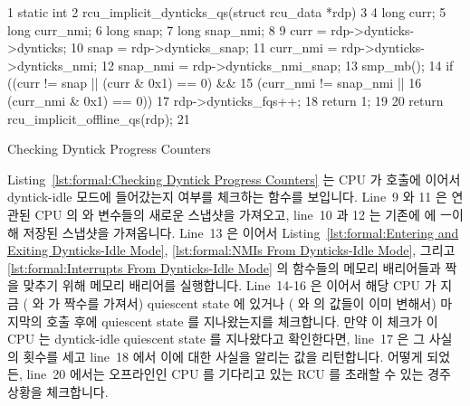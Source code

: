 \begin{listing}[tbp]
{ \scriptsize
\begin{verbbox}
 1  static int
 2  rcu_implicit_dynticks_qs(struct rcu_data *rdp)
 3  {
 4    long curr;
 5    long curr_nmi;
 6    long snap;
 7    long snap_nmi;
 8 
 9    curr = rdp->dynticks->dynticks;
10    snap = rdp->dynticks_snap;
11    curr_nmi = rdp->dynticks->dynticks_nmi;
12    snap_nmi = rdp->dynticks_nmi_snap;
13    smp_mb();
14    if ((curr != snap || (curr & 0x1) == 0) &&
15        (curr_nmi != snap_nmi ||
16        (curr_nmi & 0x1) == 0)) {
17      rdp->dynticks_fqs++;
18      return 1;
19    }
20    return rcu_implicit_offline_qs(rdp);
21  }
\end{verbbox}
}
\centering
\theverbbox
\caption{Checking Dyntick Progress Counters}
\label{lst:formal:Checking Dyntick Progress Counters}
\end{listing}

Listing~\ref{lst:formal:Checking Dyntick Progress Counters}
는 CPU 가  호출에 이어서 dyntick-idle
모드에 들어갔는지 여부를 체크하는  함수를
보입니다.
Line~9 와 11 은 연관된 CPU 의  와  변수들의
새로운 스냅샷을 가져오고, line~10 과 12 는 기존에
 에 ㅡ이해 저장된 스냅샷을 가져옵니다.
Line~13 은 이어서
Listing~\ref{lst:formal:Entering and Exiting Dynticks-Idle Mode},
\ref{lst:formal:NMIs From Dynticks-Idle Mode}, 그리고
\ref{lst:formal:Interrupts From Dynticks-Idle Mode} 의 함수들의 메모리
배리어들과 짝을 맞추기 위해 메모리 배리어를 실행합니다.
Line~14-16 은 이어서 해당 CPU 가 지금 ( 와  가 짝수를
가져서) quiescent state 에 있거나 ( 와  의 값들이
이미 변해서) 마지막의  호출 후에 quiescent
state 를 지나왔는지를 체크합니다.
만약 이 체크가 이 CPU 는 dyntick-idle quiescent state 를 지나왔다고 확인한다면,
line~17 은 그 사실의 횟수를 세고 line~18 에서 이에 대한 사실을 알리는 값을
리턴합니다.
어떻게 되었든, line~20 에서는 오프라인인 CPU 를 기다리고 있는 RCU 를 초래할 수
있는 경주 상황을 체크합니다.
\iffalse

